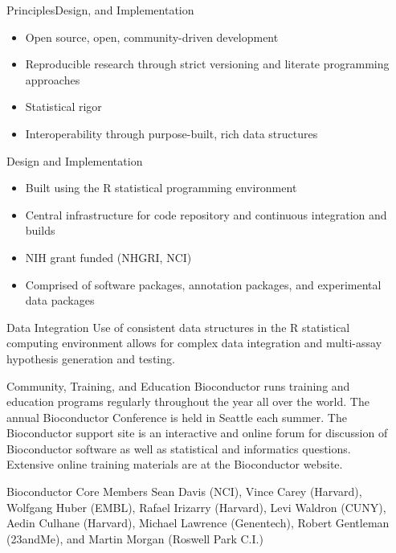 \documentclass[final]{beamer}
\begin{document}
\begin{frame}[t]
\begin{columns}[t]
\begin{column}{0.48\linewidth}
 \end{column}
    \begin{column}{0.24\linewidth}
      \begin{block}{PrinciplesDesign, and Implementation}
        \begin{itemize}
        \item{Open source, open, community-driven development}
        \item{Reproducible research through strict versioning and literate programming approaches}
        \item{Statistical rigor}
        \item{Interoperability through purpose-built, rich data structures}
        \end{itemize}
      \end{block}
      \begin{block}{Design and Implementation}
        \begin{itemize}
        \item{Built using the R statistical programming environment}
        \item{Central infrastructure for code repository and continuous integration and builds}
        \item{NIH grant funded (NHGRI, NCI)}
        \item{Comprised of software packages, annotation packages, and experimental data packages}
        \end{itemize}
      \end{block}
      \begin{block}{Data Integration}
        Use of consistent data structures in the R statistical computing environment allows for complex data integration and multi-assay hypothesis generation and testing.
      \end{block}
      \begin{block}{Community, Training, and Education}
\small{Bioconductor runs training and education programs regularly throughout the year all over the world.  The annual Bioconductor Conference is held in Seattle each summer.  The Bioconductor support site is an interactive and online forum for discussion of Bioconductor software as well as statistical and informatics questions. Extensive online training materials are at the Bioconductor website.}
      \end{block}
      \begin{block}{Bioconductor Core Members}
        \small{Sean Davis (NCI), Vince Carey (Harvard), Wolfgang Huber (EMBL), Rafael Irizarry (Harvard), Levi Waldron (CUNY), Aedin Culhane (Harvard), Michael Lawrence (Genentech), Robert Gentleman (23andMe), and Martin Morgan (Roswell Park C.I.)}
      \end{block}
    \end{column}
    \end{columns}
  \end{frame}
\end{document}
